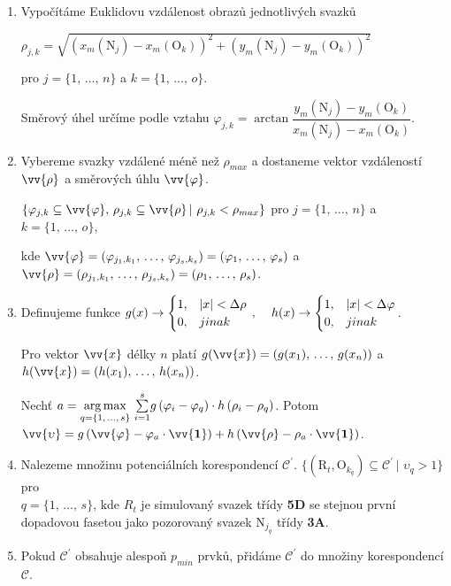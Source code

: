 \begin{enumerate}
\item Vypočítáme Euklidovu vzdálenost obrazů jednotlivých svazků

$\rho_{j,k} = \sqrt{\left( x_m(\mathrm{N}_j) - x_m(\mathrm{O}_k) \right)^2 + \left( y_m(\mathrm{N}_j) - y_m(\mathrm{O}_k) \right)^2}$ 

pro $j = \lbrace 1,\,\dots,\,n \rbrace$ a $k = \lbrace 1,\,\dots,\,o \rbrace$. 

Směrový úhel určíme podle vztahu $\varphi_{j,k} = \arctan\dfrac{y_m(\mathrm{N}_j) - y_m(\mathrm{O}_k)}{x_m(\mathrm{N}_j) - x_m(\mathrm{O}_k)}$.

\item Vybereme svazky vzdálené méně než $\rho_{max}$ a dostaneme vektor vzdáleností $\vv{\rho}$ a směrových úhlu $\vv{\varphi}$.

$\lbrace \varphi_{j,k} \subseteq \vv{\varphi},\,\rho_{j,k} \subseteq \vv{\rho}\,|\,\, \rho_{j,k} < \rho_{max} \rbrace$ pro $j = \lbrace 1,\,\dots,\,n \rbrace$ a $k = \lbrace 1,\,\dots,\,o \rbrace$,
 
 kde  $\vv{\varphi} = (\varphi_{{j_1},{k_1}},\,\dots,\,\varphi_{{j_s},{k_s}}) = (\varphi_{1},\,\dots,\,\varphi_{s})$ a $\vv{\rho} = (\rho_{{j_1},{k_1}},\,\dots,\,\rho_{{j_s},{k_s}}) = (\rho_{1},\,\dots,\,\rho_{s})$. 

\item Definujeme funkce $g(x)\rightarrow \begin{cases}
1, & |x| < \Delta\rho\\
0, & jinak
\end{cases}\,, \hspace{4mm}h(x) \rightarrow \begin{cases}
1, & |x| < \Delta\varphi\\
0, & jinak
\end{cases}$. 

Pro vektor $\vv{x}$ délky $n$ platí $g(\vv{x}) = \left(g(x_1),\,\dots,\,g(x_n)\right)$ a $h(\vv{x}) = \left(h(x_1),\,\dots,\,h(x_n)\right)$.

 Nechť $a = \underset{{q = \lbrace1,\,\dots,\,s\rbrace}}{\operatorname*{arg\,max}}\,\, \overset{s}{\underset{{i = 1}}{\sum}} g\left(\varphi_i-\varphi_q\right)\cdot h\left(\rho_i-\rho_q\right) $. Potom $\vv{\upsilon} = g\left(\vv{\varphi} - \varphi_a\cdot\vv{\mathbf{1}} \right) + h\left(\vv{\rho} - \rho_a\cdot\vv{\mathbf{1}} \right)$.


\item Nalezeme množinu potenciálních korespondencí $\mathcal{C^\prime}$. $\lbrace \left(\mathrm{R}_t,\mathrm{O}_{k_q}\right) \subseteq \mathcal{C^\prime} \,|\,\, \upsilon_q > 1 \rbrace$ pro \\$q=\lbrace1,\,\dots,\,s\rbrace$, kde $R_t$ je simulovaný  svazek třídy \textbf{5D} se stejnou první dopadovou fasetou jako pozorovaný svazek $\mathrm{N}_{j_q}$ třídy \textbf{3A}.

\item Pokud $\mathcal{C^\prime}$ obsahuje alespoň $p_{min}$ prvků, přidáme $\mathcal{C^\prime}$ do množiny korespondencí $\mathcal{C}$.

 
\end{enumerate}

